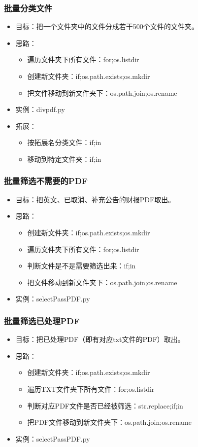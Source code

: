 \documentclass[13pt]{beamer}
\begin{document}
\begin{frame}
\frametitle{批量分类文件}
  \begin{itemize}
  \item<1-> 目标：把一个文件夹中的文件分成若干500个文件的文件夹。
  \item<2-> 思路：
  \pause
  \begin{itemize}
    \item 遍历文件夹下所有文件：for;os.listdir
    \pause
    \item 创建新文件夹：if;os.path.exists;os.mkdir
    \pause
    \item 把文件移动到新文件夹下：os.path.join;os.rename
  \end{itemize}
  \item<3-> 实例：divpdf.py
  \item<4-> 拓展：
  \pause
  \begin{itemize}
    \item 按拓展名分类文件：if;in
    \pause
    \item 移动到特定文件夹：if;in
  \end{itemize}
  \end{itemize}
\end{frame}


\begin{frame}
\frametitle{批量筛选不需要的PDF}
  \begin{itemize}
  \item<1-> 目标：把英文、已取消、补充公告的财报PDF取出。
  \item<2-> 思路：
  \pause
  \begin{itemize}
    \item 创建新文件夹：if;os.path.exists;os.mkdir
    \pause
    \item 遍历文件夹下所有文件：for;os.listdir
    \pause
    \item 判断文件是不是需要筛选出来：if;in
    \pause
    \item 把文件移动到新文件夹下：os.path.join;os.rename
   \end{itemize}
  \item<3-> 实例：selectPassPDF.py
  \end{itemize}
\end{frame}

\begin{frame}
\frametitle{批量筛选已处理PDF}
\begin{itemize}
  \item<1-> 目标：把已处理PDF（即有对应txt文件的PDF）取出。
  \item<2-> 思路：
  \pause
  \begin{itemize}
    \item 创建新文件夹：if;os.path.exists;os.mkdir
    \pause
    \item 遍历TXT文件夹下所有文件：for;os.listdir
    \pause
    \item 判断对应PDF文件是否已经被筛选：str.replace;if;in
    \pause
    \item 把PDF文件移动到新文件夹下：os.path.join;os.rename
   \end{itemize}
  \item<3-> 实例：selectPassPDF.py
\end{itemize}
\end{frame}
\end{document}
